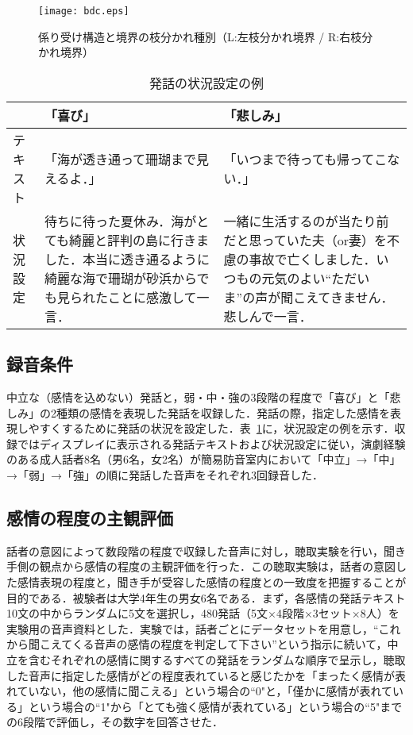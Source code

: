 \documentclass[japanese]{jnlp_1.3b}
\begin{document}
\begin{figure}[t]
\begin{center}
    \texttt{[image: bdc.eps]}
\end{center}
\caption{係り受け構造と境界の枝分かれ種別（L:左枝分かれ境界 / R:右枝分かれ境界）}
\label{bdc}
\end{figure}

\begin{table}[t]
\caption{発話の状況設定の例}
\label{jyoukyou}
\begin{tabular}{p{}p{}p{}}
\hline
&「喜び」&「悲しみ」\\
\hline
テキスト&「海が透き通って珊瑚まで見えるよ．」&「いつまで待っても帰ってこない．」\\
状況設定& 待ちに待った夏休み．海がとても綺麗と評判の島に行きました．本当に透き通るように綺麗な海で珊瑚が砂浜からでも見られたことに感激して一言．&
一緒に生活するのが当たり前だと思っていた夫（or妻）を不慮の事故で亡くしました．いつもの元気のよい“ただいま”の声が聞こえてきません．悲しんで一言．\\
\hline
\end{tabular}
\end{table}

\subsection{録音条件}

中立な（感情を込めない）発話と，弱・中・強の3段階の程度で「喜び」と「悲しみ」の2種類の感情を表現した発話を収録した．発話の際，指定した感情を表現しやすくするために発話の状況を設定した．表~\ref{jyoukyou}に，状況設定の例を示す．収録ではディスプレイに表示される発話テキストおよび状況設定に従い，演劇経験のある成人話者8名（男6名，女2名）が簡易防音室内において「中立」→「中」→「弱」→「強」の順に発話した音声をそれぞれ3回録音した．

\subsection{感情の程度の主観評価}\label{subeva}
話者の意図によって数段階の程度で収録した音声に対し，聴取実験を行い，聞き手側の観点から感情の程度の主観評価を行った．この聴取実験は，話者の意図した感情表現の程度と，聞き手が受容した感情の程度との一致度を把握することが目的である．被験者は大学4年生の男女6名である．まず，各感情の発話テキスト10文の中からランダムに5文を選択し，480発話（5文×4段階×3セット×8人）を実験用の音声資料とした．実験では，話者ごとにデータセットを用意し，``これから聞こえてくる音声の感情の程度を判定して下さい''という指示に続いて，中立を含むそれぞれの感情に関するすべての発話をランダムな順序で呈示し，聴取した音声に指定した感情がどの程度表れていると感じたかを「まったく感情が表れていない，他の感情に聞こえる」という場合の``0"と，「僅かに感情が表れている」という場合の``1"から「とても強く感情が表れている」という場合の``5"までの6段階で評価し，その数字を回答させた．
\end{document}
